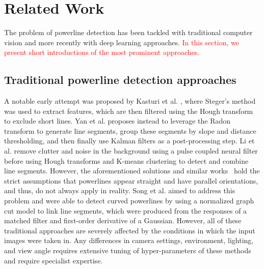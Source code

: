 \documentclass[journal]{IEEEtran}
\newcommand{\textK}[1]{\textcolor{red}{#1}}
\begin{document}
\section{Related Work}


The problem of powerline detection has been tackled with traditional computer vision and more recently with deep learning approaches. \textK{In this section, we present short introductions of the most prominent approaches.}

\subsection{Traditional powerline detection approaches}

A notable early attempt was proposed by Kasturi et al. \cite{related_work_kasturi_2002}, where Steger's method \cite{related_work_steger_1998} was used to extract features, which are then filtered using the Hough transform to exclude short lines. Yan et al. \cite{related_work_guanjian_yan_2007} proposes instead to leverage the Radon transform to generate line segments, group these segments by slope and distance thresholding, and then finally use Kalman filters as a post-processing step. Li et al. \cite{related_work_li_zhenrong_2010} remove clutter and noise in the background using a pulse coupled neural filter before using Hough transforms and K-means clustering to detect and combine line segments. However, the aforementioned solutions and similar works~\cite{related_work_candamo_2009, related_work_golightly_2005, related_work_zhengrong_li_2008, related_work_boris_alpatov_2016} hold the strict assumptions that powerlines appear straight and have parallel orientations, and thus, do not always apply in reality. Song et al. \cite{related_work_biqin_song_2014} aimed to address this problem and were able to detect curved powerlines by using a normalized graph cut model to link line segments, which were produced from the responses of a matched filter and first-order derivative of a Gaussian. However, all of these traditional approaches are severely affected by the conditions in which the input images were taken in. Any differences in camera settings, environment, lighting, and view angle requires extensive tuning of hyper-parameters of these methods and require specialist expertise.
\end{document}
